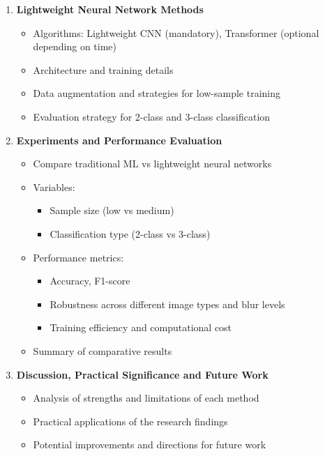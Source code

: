 \begin{enumerate}
    \item \textbf{Lightweight Neural Network Methods}
    \begin{itemize}
        \item Algorithms: Lightweight CNN (mandatory), Transformer (optional depending on time)
        \item Architecture and training details
        \item Data augmentation and strategies for low-sample training
        \item Evaluation strategy for 2-class and 3-class classification
    \end{itemize}

    \item \textbf{Experiments and Performance Evaluation}
    \begin{itemize}
        \item Compare traditional ML vs lightweight neural networks
        \item Variables:
        \begin{itemize}
            \item Sample size (low vs medium)
            \item Classification type (2-class vs 3-class)
        \end{itemize}
        \item Performance metrics:
        \begin{itemize}
            \item Accuracy, F1-score
            \item Robustness across different image types and blur levels
            \item Training efficiency and computational cost
        \end{itemize}
        \item Summary of comparative results
    \end{itemize}

    \item \textbf{Discussion, Practical Significance and Future Work}
    \begin{itemize}
        \item Analysis of strengths and limitations of each method
        \item Practical applications of the research findings
        \item Potential improvements and directions for future work
    \end{itemize}

\end{enumerate}

